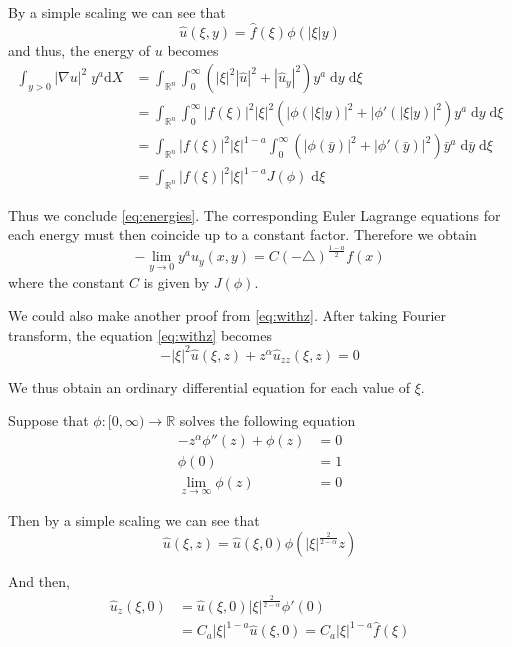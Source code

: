 \documentclass[letterpaper]{article}
\numberwithin{equation}{section}
\newcommand{\abs}[1]{\left\vert#1\right\vert}
\newcommand{\R}{\mathbb R}
\newcommand{\grad} {\nabla}
\newcommand{\lap} {\triangle}
\newcommand{\dd} {\; \mathrm{d}}
\newcommand{\party}[1] {#1_y}
\newcommand{\ydd} {\; y^a \mathrm{d}}
\begin{document}
By a simple scaling we can see that
\[ \hat u(\xi,y) = \hat f(\xi) \phi(\abs{\xi} y) \]
and thus, the energy of $u$ becomes
\begin{align*}
 \int_{y>0} \abs{\grad u}^2 \ydd X &= \int_{\R^n} \int_0^\infty  (\abs{\xi}^2 \abs{\hat u}^2 + \abs{\hat u_y}^2) y^a \dd y \dd \xi \\
 &= \int_{\R^n} \int_0^\infty \abs{f(\xi)}^2 \abs{\xi}^2 \left( \abs{\phi(\abs{\xi} y)}^2 + \abs{\phi'(\abs{\xi} y)}^2 \right) y^a \dd y \dd \xi \\
 &= \int_{\R^n} \abs{f(\xi)}^2 \abs{\xi}^{1-a} \int_0^\infty \left( \abs{\phi(\bar y)}^2 + \abs{\phi'(\bar y)}^2 \right) {\bar y}^a \dd \bar y \dd \xi \\
 &= \int_{\R^n} \abs{f(\xi)}^2 \abs{\xi}^{1-a} J(\phi) \dd \xi 
\end{align*}

Thus we conclude \eqref{eq:energies}. The corresponding Euler Lagrange equations for each energy must then coincide up to a constant factor. Therefore we obtain
\[ -\lim_{y \to 0} y^a \party u(x,y) = C (-\lap)^{\frac{1-a}{2}} f(x) \]
where the constant $C$ is given by $J(\phi)$.

We could also make another proof from \eqref{eq:withz}. After taking Fourier transform, the equation \eqref{eq:withz} becomes
\[ -\abs{\xi}^2 \hat u(\xi,z) + z^\alpha \hat u_{zz}(\xi,z) = 0 \]

We thus obtain an ordinary differential equation for each value of $\xi$.

Suppose that $\phi : [0,\infty) \to \R$ solves the following equation
\begin{equation} \label{eq:fwithz}
\begin{aligned}
 -z^\alpha \phi''(z) + \phi(z) &= 0 \\
 \phi(0) &= 1 \\
 \lim_{z \to \infty} \phi(z) &=0
\end{aligned}
\end{equation}

Then by a simple scaling we can see that
\[ \hat u(\xi,z) = \hat u(\xi,0) \phi(\abs{\xi}^{\frac{2}{2-\alpha}} z) \]

And then, 
\[ 
\begin{split}
\hat u_z(\xi,0) &= \hat u(\xi,0) \abs{\xi}^{\frac{2}{2-\alpha}} \phi'(0) \\
&= C_a \abs{\xi}^{1-a} \hat u(\xi,0) = C_a \abs{\xi}^{1-a} \hat f(\xi)
\end{split}
\]
\end{document}
